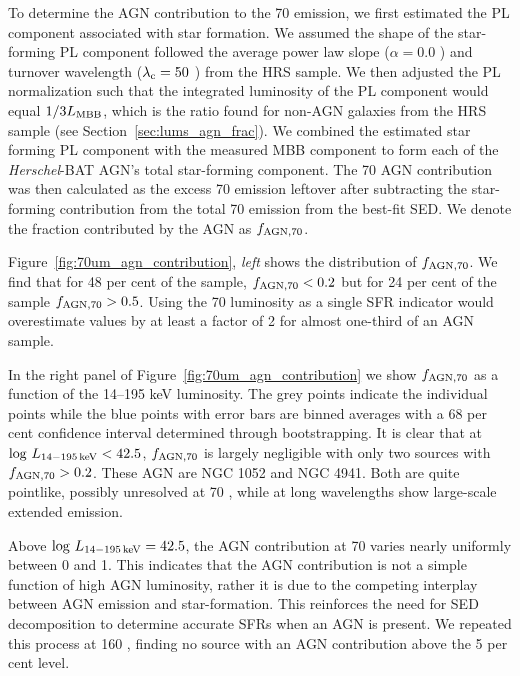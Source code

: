 \documentclass[fleqn, usenatbib]{mnras}
\newcommand{\herschel}{\emph{Herschel}}
\begin{document}
To determine the AGN contribution to the 70 \micron{} emission, we first estimated the PL component associated with star formation. We assumed the shape of the star-forming PL component followed the average power law slope ($\alpha=0.0$ ) and turnover wavelength ($\lambda_{\rm c} = 50$ \micron) from the HRS sample. We then adjusted the PL normalization such that the integrated luminosity of the PL component would equal $1/3L_{\rm MBB}$, {\color{red}which is the ratio found for non-AGN galaxies from the HRS sample (see Section~\ref{sec:lums_agn_frac})}. We combined the estimated star forming PL component with the measured MBB component to form each of the \herschel-BAT AGN's total star-forming component. The 70 \micron{} AGN contribution was then calculated as the excess 70 \micron{} emission leftover after subtracting the star-forming contribution from the total 70 \micron{} emission from the best-fit SED. We denote the fraction contributed by the AGN as $f_{\rm AGN, 70}$.

Figure~\ref{fig:70um_agn_contribution}, \textit{left} shows the distribution of $f_{\rm AGN, 70}$. We find that for 48 per cent of the sample,  $f_{\rm AGN, 70} < 0.2$ but for 24 per cent of the sample $f_{\rm AGN, 70} > 0.5$. Using the 70 \micron{} luminosity as a single SFR indicator would overestimate values by at least a factor of 2 for almost one-third of an AGN sample. 

In the right panel of Figure~\ref{fig:70um_agn_contribution} we show $f_{\rm AGN, 70}$ as a function of the 14--195 keV luminosity. The grey points indicate the individual points while the blue points with error bars are binned averages with a 68 per cent confidence interval determined through bootstrapping. It is clear that at $\log\,L_{\rm 14-195\,keV} < 42.5$, $f_{\rm AGN, 70}$ is largely negligible with only two sources with $f_{\rm AGN, 70} > 0.2$. These AGN are NGC 1052 and NGC 4941. Both are quite pointlike, possibly unresolved at 70 \micron, while at long wavelengths show large-scale extended emission.

Above $\log\,L_{\rm 14-195\,keV} = 42.5$, the AGN contribution at 70 \micron{} varies nearly uniformly between 0 and 1. This indicates that the AGN contribution is not a simple function of high AGN luminosity, rather it is due to the competing interplay between AGN emission and star-formation. This reinforces the need for SED decomposition to determine accurate SFRs when an AGN is present. We repeated this process at 160 \micron, finding no source with an AGN contribution above the 5 per cent level.
\end{document}
